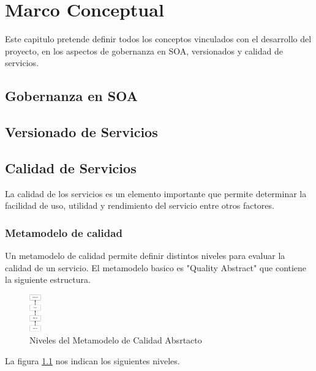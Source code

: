 \documentclass[a4paper,openright,12pt]{report}
\begin{document}
\chapter{Marco Conceptual}
Este capitulo pretende definir todos los conceptos vinculados con el desarrollo del proyecto, en los aspectos de gobernanza en SOA, versionados y calidad de servicios.
\section{Gobernanza en SOA}
\section{Versionado de Servicios}
\section{Calidad de Servicios}
La calidad de los servicios es un elemento importante que permite determinar la facilidad de uso, utilidad y rendimiento del servicio entre otros factores.
\subsection{Metamodelo de calidad}
Un metamodelo de calidad permite definir distintos niveles para evaluar la calidad de un servicio. El metamodelo basico es "Quality Abstract" que contiene la siguiente estructura.
\begin{figure} [h]
\centering
\includegraphics[width=0.5cm]{images/pdf/metamodelo_de_calidad.png}
	\caption{Niveles del Metamodelo de Calidad Absrtacto}
  	\label{figura:metamodelo_de_calidad}
\end{figure}

La figura \ref{figura:metamodelo_de_calidad} nos indican los siguientes niveles.
\end{document}
